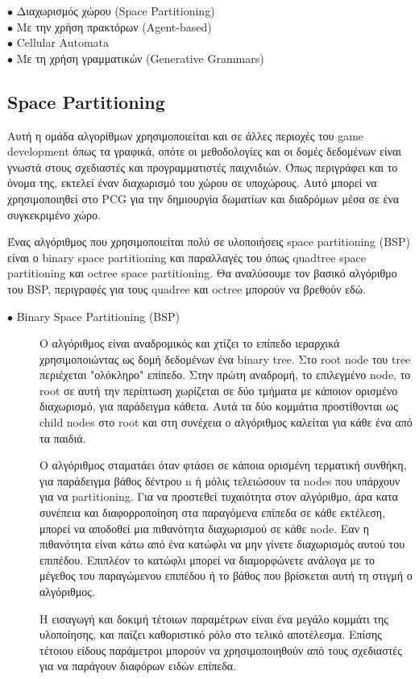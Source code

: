 \begin{description}
  \item[$\bullet$ Διαχωρισμός χώρου (Space Partitioning)] 
  \item[$\bullet$ Με την χρήση πρακτόρων (Agent-based)]
    \item[$\bullet$ Cellular Automata] 
    \item[$\bullet$ Με τη χρήση γραμματικών (Generative Grammars)] 
\end{description}

\subsection{Space Partitioning}
Αυτή η ομάδα αλγορίθμων χρησιμοποιείται και σε άλλες περιοχές του game development όπως τα γραφικά, οπότε οι μεθοδολογίες και οι δομές δεδομένων είναι γνωστά στους σχεδιαστές και προγραμματιστές παιχνιδιών. Όπως περιγράφει και το όνομα της, εκτελεί έναν διαχωρισμό του χώρου σε υποχώρους. Αυτό μπορεί να χρησιμοποιηθεί στο PCG για την δημιουργία δωματίων και διαδρόμων μέσα σε ένα  συγκεκριμένο χώρο.
\par
Ένας αλγόριθμος που χρησιμοποιείται πολύ σε υλοποιήσεις space partitioning (BSP) είναι ο binary space partitioning και παραλλαγές του όπως quadtree space partitioning και octree space partitioning. Θα αναλύσουμε τον βασικό αλγόριθμο του BSP, περιγραφές για τους quadree και octree μπορούν να βρεθούν εδώ.

\begin{description}
  \item[$\bullet$ Binary Space Partitioning (BSP)]
  Ο αλγόριθμος είναι αναδρομικός και χτίζει το επίπεδο ιεραρχικά χρησιμοποιώντας ως δομή δεδομένων ένα binary tree. Στο root node του tree περιέχεται "ολόκληρο" επίπεδο. Στην πρώτη αναδρομή, το επιλεγμένο node, το root σε αυτή την περίπτωση χωρίζεται σε δύο τμήματα με κάποιον ορισμένο διαχωρισμό, για παράδειγμα κάθετα. Αυτά τα δύο κομμάτια προστίθονται ως child nodes στο root και στη συνέχεια ο αλγόριθμος καλείται για κάθε ένα από τα παιδιά.
  \par
  Ο αλγόριθμος σταματάει όταν φτάσει σε κάποια ορισμένη τερματική συνθήκη, για παράδειγμα βάθος δέντρου n ή μόλις τελειώσουν τα nodes που υπάρχουν για να partitioning. Για να προστεθεί τυχαιότητα στον αλγόριθμο, άρα κατα συνέπεια και διαφορροποίηση στα παραγόμενα επίπεδα σε κάθε εκτέλεση, μπορεί να αποδοθεί μια πιθανότητα διαχωρισμού σε κάθε node. Εαν η πιθανότητα είναι κάτω από ένα κατώφλι να μην γίνετε διαχωρισμός αυτού του επιπέδου. Επιπλέον το κατώφλι μπορεί να διαμορφώνετε ανάλογα με το μέγεθος του παραγώμενου επιπέδου ή το βάθος που βρίσκεται αυτή τη στιγμή ο αλγόριθμος.
  \par 
  Η εισαγωγή και δοκιμή τέτοιων παραμέτρων είναι ένα μεγάλο κομμάτι της υλοποίησης, και παίζει καθοριστικό ρόλο στο τελικό αποτέλεσμα. Επίσης τέτοιου είδους παράμετροι μπορούν να χρησιμοποιηθούν από τους σχεδιαστές για να παράγουν διαφόρων ειδών επίπεδα.
\end{description}

